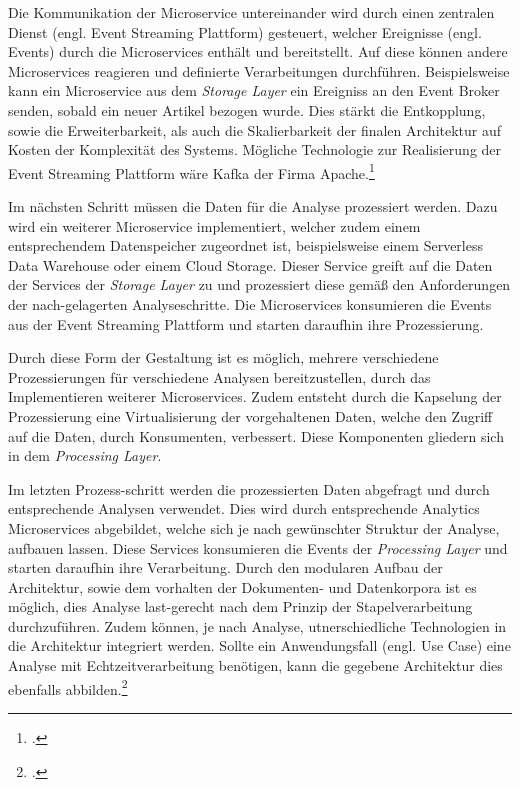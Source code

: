 Die Kommunikation der Microservice untereinander wird durch einen zentralen Dienst (engl. Event Streaming Plattform) gesteuert, welcher Ereignisse (engl. Events) durch die Microservices enthält und bereitstellt. Auf diese können andere Microservices reagieren und definierte Verarbeitungen durchführen. Beispielsweise kann ein Microservice aus dem \textit{Storage Layer} ein Ereigniss an den Event Broker senden, sobald ein neuer Artikel bezogen wurde. Dies stärkt die Entkopplung, sowie die Erweiterbarkeit, als auch die Skalierbarkeit der finalen Architektur auf Kosten der Komplexität des Systems.
Mögliche Technologie zur Realisierung der Event Streaming Plattform wäre Kafka der Firma Apache.\footcite[Vgl.][]{Kul.PublishSubscribeMicroservices.2021}{}{}

Im nächsten Schritt müssen die Daten für die Analyse prozessiert werden. Dazu wird ein weiterer Microservice implementiert, welcher zudem einem entsprechendem Datenspeicher zugeordnet ist, beispielsweise einem Serverless Data Warehouse oder einem Cloud Storage. 
Dieser Service greift auf die Daten der Services der \textit{Storage Layer} zu und prozessiert diese gemäß den Anforderungen der nach-gelagerten Analyseschritte. 
Die Microservices konsumieren die Events aus der Event Streaming Plattform und starten daraufhin ihre Prozessierung.

Durch diese Form der Gestaltung ist es möglich, mehrere verschiedene Prozessierungen für verschiedene Analysen bereitzustellen, durch das Implementieren weiterer Microservices. Zudem entsteht durch die Kapselung der Prozessierung eine Virtualisierung der vorgehaltenen Daten, welche den Zugriff auf die Daten, durch Konsumenten, verbessert. Diese Komponenten gliedern sich in dem \textit{Processing Layer}.

Im letzten Prozess-schritt werden die prozessierten Daten abgefragt und durch entsprechende Analysen verwendet. Dies wird durch entsprechende Analytics Microservices abgebildet, welche sich je nach gewünschter Struktur der Analyse, aufbauen lassen. Diese Services konsumieren die Events der \textit{Processing Layer} und starten daraufhin ihre Verarbeitung. Durch den modularen Aufbau der Architektur, sowie dem vorhalten der Dokumenten- und Datenkorpora ist es möglich, dies Analyse last-gerecht nach dem Prinzip der Stapelverarbeitung durchzuführen.
Zudem können, je nach Analyse, utnerschiedliche Technologien in die Architektur integriert werden.
Sollte ein Anwendungsfall (engl. Use Case) eine Analyse mit Echtzeitverarbeitung benötigen, kann die gegebene Architektur dies ebenfalls abbilden.\footcite[Vgl.][]{Hsu.MicroserviceAnalyticsPlattform.2018}{}{}

